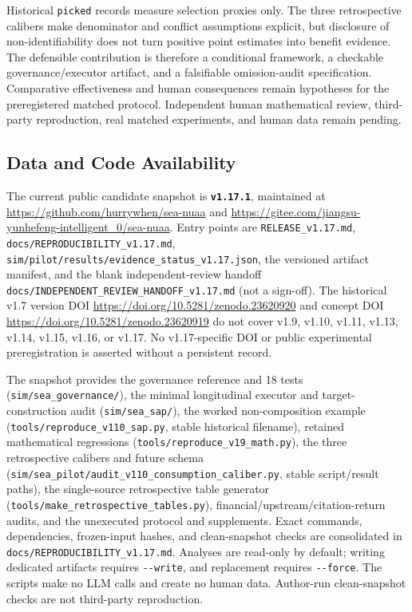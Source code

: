 \documentclass[
  11pt]{article}
\begin{document}
Historical \texttt{picked} records measure selection proxies only. The
three retrospective calibers make denominator and conflict assumptions
explicit, but disclosure of non-identifiability does not turn positive
point estimates into benefit evidence. The defensible contribution is
therefore a conditional framework, a checkable governance/executor
artifact, and a falsifiable omission-audit specification. Comparative
effectiveness and human consequences remain hypotheses for the
preregistered matched protocol. Independent human mathematical review,
third-party reproduction, real matched experiments, and human data
remain pending.

\subsection{Data and Code
Availability}\label{data-and-code-availability}

The current public candidate snapshot is \textbf{\texttt{v1.17.1}},
maintained at \url{https://github.com/hurrywhen/sea-nuaa} and
\url{https://gitee.com/jiangsu-yunhefeng-intelligent_0/sea-nuaa}. Entry
points are \texttt{RELEASE\_v1.17.md},
\texttt{docs/REPRODUCIBILITY\_v1.17.md},
\texttt{sim/pilot/results/evidence\_status\_v1.17.json}, the versioned
artifact manifest, and the blank independent-review handoff
\texttt{docs/INDEPENDENT\_REVIEW\_HANDOFF\_v1.17.md} (not a sign-off).
The historical v1.7 version DOI
\url{https://doi.org/10.5281/zenodo.23620920} and concept DOI
\url{https://doi.org/10.5281/zenodo.23620919} do not cover v1.9, v1.10,
v1.11, v1.13, v1.14, v1.15, v1.16, or v1.17. No v1.17-specific DOI or
public experimental preregistration is asserted without a persistent
record.

The snapshot provides the governance reference and 18 tests
(\texttt{sim/sea\_governance/}), the minimal longitudinal executor and
target-construction audit (\texttt{sim/sea\_sap/}), the worked
non-composition example (\texttt{tools/reproduce\_v110\_sap.py}, stable
historical filename), retained mathematical regressions
(\texttt{tools/reproduce\_v19\_math.py}), the three retrospective
calibers and future schema
(\texttt{sim/sea\_pilot/audit\_v110\_consumption\_caliber.py}, stable
script/result paths), the single-source retrospective table generator
(\texttt{tools/make\_retrospective\_tables.py}),
financial/upstream/citation-return audits, and the unexecuted protocol
and supplements. Exact commands, dependencies, frozen-input hashes, and
clean-snapshot checks are consolidated in
\texttt{docs/REPRODUCIBILITY\_v1.17.md}. Analyses are read-only by
default; writing dedicated artifacts requires \texttt{-\/-write}, and
replacement requires \texttt{-\/-force}. The scripts make no LLM calls
and create no human data. Author-run clean-snapshot checks are not
third-party reproduction.
\end{document}
